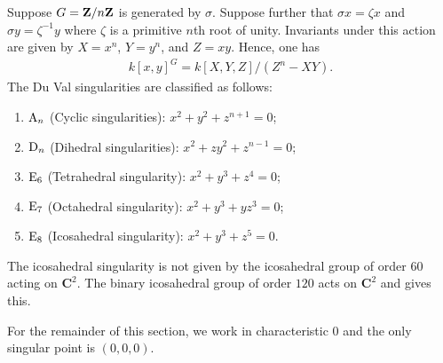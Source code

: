 \documentclass [11 pt, oneside, margin = 1 in] {article}
\begin{document}
Suppose $G=\mathbf Z / n\mathbf Z$ is generated by $\sigma$. Suppose further that $\sigma x = \zeta x$ and $\sigma y =\zeta^{-1}y$ where $\zeta$ is a primitive $n$th root of unity. Invariants under this action are given by $X =x^n$, $Y=y^n$, and $Z=xy$. Hence, one has
\begin{align*}
	k[x,y]^G = k[X,Y,Z] / (Z^n- XY).
\end{align*}
The Du Val singularities are classified as follows:
\begin{enumerate}
	\item $\operatorname{A}_n$ (Cyclic singularities): $x^2+y^2+z^{n+1}=0$;
	\item $\operatorname{D}_n$ (Dihedral singularities): $x^2+zy^2+z^{n-1}=0$;
	\item $\operatorname{E}_6$ (Tetrahedral singularity): $x^2+y^3+z^4=0$;
	\item $\operatorname{E}_7$ (Octahedral singularity): $x^2+y^3+yz^3=0$;
	\item $\operatorname{E}_8$ (Icosahedral singularity): $x^2+y^3+z^5=0$.
\end{enumerate}
The icosahedral singularity is not given by the icosahedral group of order $60$ acting on $\mathbf{C}^2$. The binary icosahedral group of order $120$ acts on $\mathbf{C}^2$ and gives this. 
\begin{remark}
	For the remainder of this section, we work in characteristic $0$ and the only singular point is $(0,0,0)$.
\end{remark}
\end{document}
